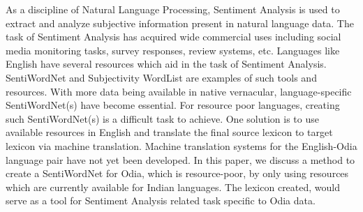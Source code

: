 As a discipline of Natural Language Processing, Sentiment Analysis is used to extract and analyze subjective information present in natural language data. The task of Sentiment Analysis has acquired wide commercial uses including social media monitoring tasks, survey responses, review systems, etc. Languages like English have several resources which aid in the task of Sentiment Analysis. SentiWordNet and Subjectivity WordList are examples of such tools and resources. With more data being available in native vernacular, language-specific SentiWordNet(s) have become essential. For resource poor languages, creating such SentiWordNet(s) is a difficult task to achieve. One solution is to use available resources in English and translate the final source lexicon to target lexicon via machine translation. Machine translation systems for the English-Odia language pair have not yet been developed. In this paper, we discuss a method to create a SentiWordNet for Odia, which is resource-poor, by only using resources which are currently available for Indian languages. The lexicon created, would serve as a tool for Sentiment Analysis related task specific to Odia data.

